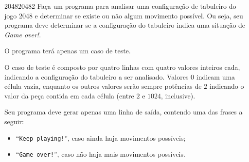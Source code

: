 \documentclass[12pt,a4paper,oneside]{article}
\begin{document}
\begin{problem}{2048}{2048}{2}
Faça um programa para analisar uma configuração de tabuleiro do jogo 2048 e determinar se existe ou não algum movimento possível. Ou seja, seu programa deve determinar se a configuração do tabuleiro indica uma situação de \textit{Game over!}.

%

\newpage
\InputFile

O programa terá apenas um caso de teste.

O caso de teste é composto por quatro linhas com quatro valores inteiros cada, indicando a configuração do tabuleiro a ser analisado. Valores $0$ indicam uma célula vazia, enquanto os outros valores serão sempre potências de $2$ indicando o valor da peça contida em cada célula (entre $2$ e $1024$, inclusive).

\OutputFile

Seu programa deve gerar apenas uma linha de saída, contendo uma das frases a seguir:
\begin{itemize}
 \item ``\texttt{Keep playing!}'', caso ainda haja movimentos possíveis;
 \item ``\texttt{Game over!}'', caso não haja mais movimentos possíveis.
 \end{itemize}
 


\Example

\begin{example}
%
\end{example}

\begin{example}
%
\end{example}

\begin{example}
%
\end{example}


\end{problem}
\end{document}
